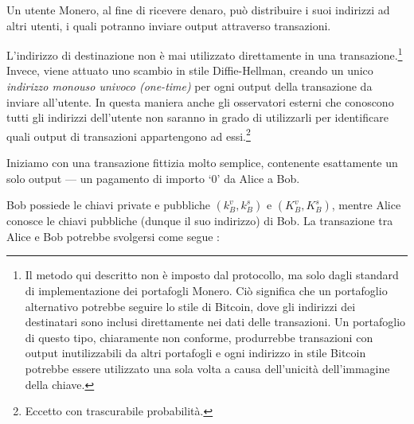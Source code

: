 Un utente Monero, al fine di ricevere denaro, può distribuire i suoi indirizzi ad altri utenti, i quali potranno inviare output attraverso transazioni.

L'indirizzo di destinazione non è mai utilizzato direttamente in una transazione.\footnote{Il metodo qui descritto non è imposto dal protocollo, ma solo dagli standard di implementazione dei portafogli Monero. Ciò significa che un portafoglio alternativo potrebbe seguire lo stile di Bitcoin, dove gli indirizzi dei destinatari sono inclusi direttamente nei dati delle transazioni. Un portafoglio di questo tipo, chiaramente non conforme, produrrebbe transazioni con output inutilizzabili da altri portafogli e ogni indirizzo in stile Bitcoin potrebbe essere utilizzato una sola volta a causa dell'unicità dell'immagine della chiave.} Invece, viene attuato uno scambio in stile Diffie-Hellman, creando un unico {\em indirizzo monouso univoco (one-time)} per ogni output della transazione da inviare all'utente. In questa maniera anche gli osservatori esterni che conoscono tutti gli indirizzi dell'utente non saranno in grado di utilizzarli per identificare quali output di transazioni appartengono ad essi.\footnote{Eccetto con trascurabile probabilità.}


Iniziamo con una transazione fittizia molto semplice, contenente esattamente un solo output --- un pagamento di importo `0' da Alice a Bob.

Bob possiede le chiavi private e pubbliche $(k_B^v, k_B^s)$ e $(K_B^v, K_B^s)$, mentre Alice conosce le chiavi pubbliche (dunque il suo indirizzo) di Bob. La transazione tra Alice e Bob potrebbe svolgersi come segue \cite{cryptoNoteWhitePaper}:

